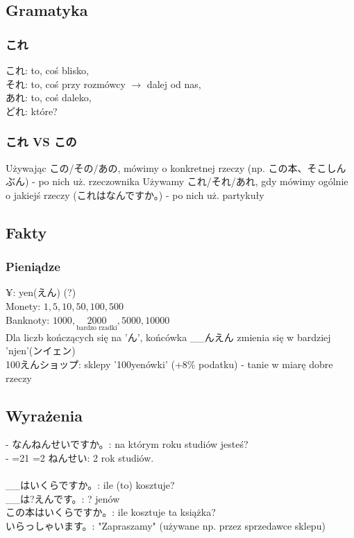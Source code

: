 \documentclass[10pt, a4paper]{article}
\def\isFurigana{1}
\newcommand{\fur}[3][2]{\ifnum2=#1\if\isFurigana1
			\ruby{#2}{#3}
		\else
			#2
		\fi
	\else
		\ifnum1=#1
			\ruby{#2}{#3}
		\else
			#2
		\fi
	\fi
}
\begin{document}
	\subsection{Gramatyka}
	\subsubsection{これ}
	これ: to, coś blisko, \\
	それ: to, coś przy rozmówcy $\to$ dalej od nas, \\
	あれ: to, coś daleko, \\
	どれ: które?
	\subsubsection{これ VS この}
	Używając この/その/あの, mówimy o konkretnej rzeczy (np. この本、そこしんぶん) - po nich uż. rzeczownika
	Używamy これ/それ/あれ, gdy mówimy ogólnie o jakiejś rzeczy (これはなんですか。) - po nich uż. partykuły
	\subsection{Fakty}
	\subsubsection{Pieniądze}
	¥: yen(えん) (?)\\
	Monety: $1, 5, 10, 50, 100, 500$ \\
	Banknoty: $1000, \underset{\text{bardzo rzadki}}{2000}, 5000, 10000$ \\
	Dla liczb kończących się na 'ん', końcówka \_\_んえん zmienia się w bardziej 'njen'(ンイェン) \\
	100えんショップ: sklepy '100yenówki' (+8\% podatku) - tanie w miarę dobre rzeczy
	\subsection{Wyrażenia}
	 - なんねんせいですか。: na którym roku studiów jesteś?　\\
	 - \fur{2}{に}ねんせい: 2 rok studiów. \\\\
	 \_\_はいくらですか。: ile (to) kosztuje? \\
	 \_\_は?えんです。: ? jenów \\
	 この本はいくらですか。: ile kosztuje ta książka? \\
	 いらっしゃいます。: "Zapraszamy" (używane np. przez sprzedawce sklepu) \\
\end{document}
